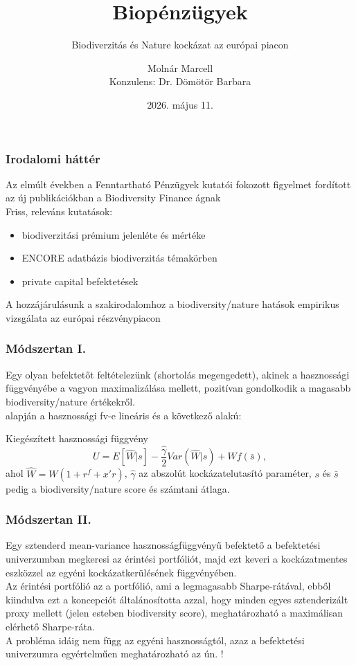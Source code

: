 \documentclass[aspectratio=169,notheorems]{corvinusmetropolis}
\title{Biopénzügyek}
\subtitle{Biodiverzitás és Nature kockázat az európai piacon}
\author{Molnár Marcell\\Konzulens: Dr. Dömötör Barbara}
\institute[Corvinus University]
  {
  Pénzügy és számvitel alapszak\\
  Pénzügy specializáció\\
  Email: \putemail\\
  }
\date{2026. május 11.}
\begin{document}
\simpleopen{}

\begin{frame}
  \frametitle{Irodalomi háttér}
  Az elmúlt években a Fenntartható Pénzügyek kutatói fokozott figyelmet fordított az új publikációkban a Biodiversity Finance ágnak\\ 
  Friss, releváns kutatások:
  \begin{itemize}
    \item \alert{biodiverzitási prémium} jelenléte és mértéke \parencite{coqueret_biodiversity_2024, naffa_biodiversity_2024}
    \item \alert{ENCORE adatbázis} biodiverzitás témakörben \parencite{clement_mapping_2025}
    \item \alert{private capital befektetések} \parencite{flammer_biodiversity_2025}\\
  \end{itemize}
  A hozzájárulásunk a szakirodalomhoz a biodiversity/nature hatások empirikus vizsgálata az európai részvénypiacon
\end{frame}

\begin{frame}
  \frametitle{Módszertan I.}
  Egy olyan befektetőt feltételezünk (shortolás megengedett), akinek a hasznossági függvényébe a vagyon maximalizálása mellett, \alert{pozitívan gondolkodik a magasabb biodiversity/nature értékekről}.\\
  \textcite{pedersen_responsible_2021} alapján a \alert{hasznossági fv-e lineáris és a következő alakú}:
  \begin{block}{Kiegészített hasznossági függvény}
  \begin{equation}
    U = E[\widehat{W}|s] - \frac{\hat{\gamma}}{2}Var(\widehat{W}|s) + Wf(\bar{s}),
  \end{equation}
  ahol $\widehat{W}=W(1+r^f+x'r)$, $\hat{\gamma}$ az abszolút kockázatelutasító paraméter, $s$ és $\bar{s}$ pedig a biodiversity/nature score és számtani átlaga.
  \end{block}
\end{frame}

\begin{frame}
  \frametitle{Módszertan II.}
  Egy sztenderd mean-variance hasznosságfüggvényű befektető a befektetési univerzumban megkeresi az \alert{érintési portfóliót}, majd ezt keveri a \alert{kockázatmentes eszközzel} az egyéni kockázatkerülésének függvényében.\\
  \medskip
Az érintési portfólió az a portfólió, ami a legmagasabb Sharpe-rátával, ebből kiindulva ezt a koncepciót \textcite{pedersen_responsible_2021} általánosította azzal, hogy \alert{minden egyes sztenderizált proxy mellett} (jelen esteben biodiversity score), \alert{meghatározható a maximálisan elérhető Sharpe-ráta}.\\
  \bigskip
  A probléma idáig nem függ az egyéni hasznosságtól, azaz a befektetési univerzumra egyértelműen meghatározható az ún. !
\end{frame}
\end{document}
